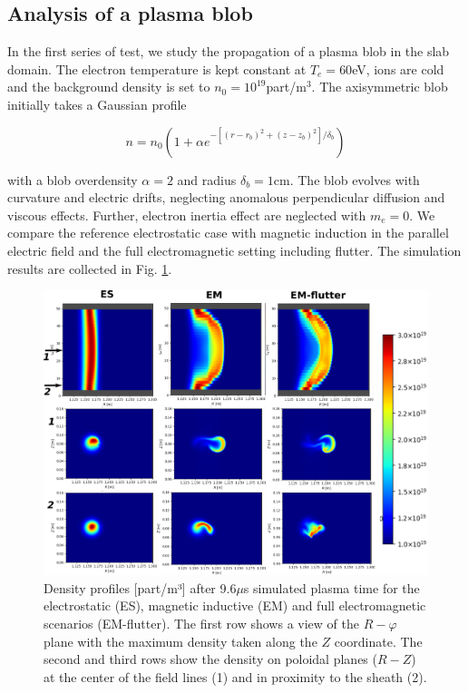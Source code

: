 \subsection{Analysis of a plasma blob}
\label{ssec:plasmablob}

In the first series of test, we study the propagation of a plasma blob in the slab domain. The electron temperature is kept constant at $T_e=60$eV, ions are cold and the background density is set to $n_0 = 10^{19}$part/m$^3$. The axisymmetric blob initially takes a Gaussian profile 

\begin{equation}
	n = n_0 \left(1 + \alpha e^{-\left[(r-r_b)^2+(z-z_b)^2\right]/\delta_b}\right)
	\label{eq:blobInitProfile}
\end{equation}

with a blob overdensity $\alpha = 2$ and radius $\delta_b = 1$cm. The blob evolves with curvature and electric drifts, neglecting anomalous perpendicular diffusion and viscous effects. Further, electron inertia effect are neglected with $m_e = 0$. We compare the reference electrostatic case with magnetic induction in the parallel electric field and the full electromagnetic setting including flutter. The simulation results are collected in Fig. \ref{fig:BLOB}. \newline

\begin{figure}[H]\centering
	\centering
	\includegraphics[width=1.\textwidth]{schemes/blob_compare_9_6_microsec.png}
	\caption[Density profiles after 9.6$\mu$s simulated plasma time for the electrostatic (ES), magnetic inductive (EM) and full electromagnetic scenarios (EM-flutter)]{Density profiles [part/m³] after 9.6$\mu$s simulated plasma time for the electrostatic (ES), magnetic inductive (EM) and full electromagnetic scenarios (EM-flutter). The first row shows a view of the $R-\varphi$ plane with the maximum density taken along the $Z$ coordinate. The second and third rows show the density on poloidal planes ($R-Z$) at the center of the field lines (1) and in proximity to the sheath (2).}
	\label{fig:BLOB}
\end{figure}

